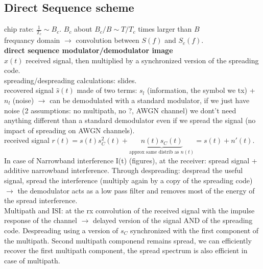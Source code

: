 \subsection{Direct Sequence scheme}
chip rate: $\frac{1}{T_c} \sim B_c$. $B_c$ about $B_c/B \sim T/T_c$ times larger than $B$\\
frequancy domain $\rightarrow$ convolution between $S(f)$ and $S_c(f)$.\\
\textbf{direct sequence modulator/demodulator image}\\
$\hat{x}(t)$ received signal, then multiplied by a synchronized version of the spreading code. \\
spreading/despreading calculations: slides.\\
recovered signal $\hat{s}(t)$ made of two terms: $s_l$ (information, the symbol we tx) + $n_l$ (noise) $\rightarrow$ can be demodulated with a standard modulator, if we just have noise (2 assumptions: no multipath, no ?, AWGN channel) we dont't need anything different than a standard demodulator even if we spread the signal (no impact of spreading on AWGN channels). \\
received signal $r(t) = s(t)s_C^2(t) + \underbrace{n(t)s_C(t)}_{\textrm{approx same distrib as } n(t)}= s(t) + n'(t)$.\\
In case of Narrowband interference I(t) (figures), at the receiver: spread signal + additive narrowband interference. Through despreading: despread the useful signal, spread the interference (multiply again by a copy of the spreading code) $\rightarrow$ the demodulator acts as a low pass filter and removes most of the energy of the spread interference.\\
Multipath and ISI: at the rx convolution of the received signal with the impulse response of the channel $\rightarrow$ delayed version of the signal AND of the spreading code. Despreading using a version of $s_C$ synchronized with the first component of the multipath. Second multipath componend remains spread, we can efficiently recover the first multipath component, the spread spectrum is also efficient in case of multipath.\\

